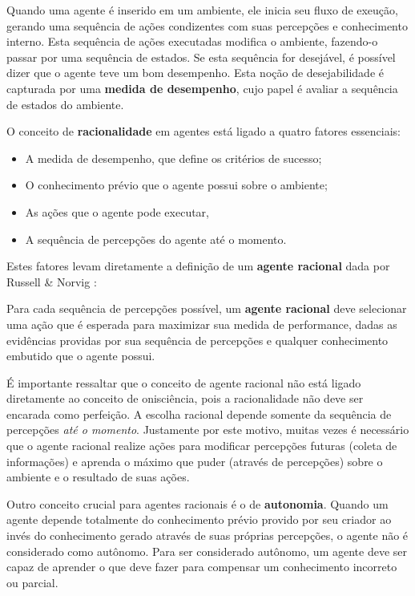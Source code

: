 Quando uma agente é inserido em um ambiente, ele inicia seu fluxo de exeução,
gerando uma sequência de ações condizentes com suas percepções e conhecimento
interno. Esta sequência de ações executadas modifica o ambiente, fazendo-o
passar por uma sequência de estados. Se esta sequência for desejável, é possível
dizer que o agente teve um bom desempenho. Esta noção de desejabilidade é
capturada por uma \textbf{medida de desempenho}, cujo papel é avaliar a
sequência de estados do ambiente.

O conceito de \textbf{racionalidade} em agentes está ligado a quatro fatores
essenciais:

\begin{itemize}
	\item A medida de desempenho, que define os critérios de sucesso;
	\item O conhecimento prévio que o agente possui sobre o ambiente;
	\item As ações que o agente pode executar,
	\item A sequência de percepções do agente até o momento.
\end{itemize}

Estes fatores levam diretamente a definição de um \textbf{agente racional} dada
por Russell \& Norvig \cite{RussellNorvig200912}:

\begin{directcite}
	Para cada sequência de percepções possível, um \textbf{agente racional} deve
	selecionar uma ação que é esperada para maximizar sua medida de performance,
	dadas as evidências providas por sua sequência de percepções e qualquer
	conhecimento embutido que o agente possui.
\end{directcite}

É importante ressaltar que o conceito de agente racional não está ligado
diretamente ao conceito de onisciência, pois a racionalidade não deve ser
encarada como perfeição. A escolha racional depende somente da sequência de
percepções \textit{até o momento}. Justamente por este motivo, muitas vezes é
necessário que o agente racional realize ações para modificar percepções futuras
(coleta de informações) e aprenda o máximo que puder (através de percepções)
sobre o ambiente e o resultado de suas ações.

Outro conceito crucial para agentes racionais é o de \textbf{autonomia}. Quando
um agente depende totalmente do conhecimento prévio provido por seu criador ao
invés do conhecimento gerado através de suas próprias percepções, o agente não é
considerado como autônomo. Para ser considerado autônomo, um agente deve ser
capaz de aprender o que deve fazer para compensar um conhecimento incorreto ou
parcial. 

